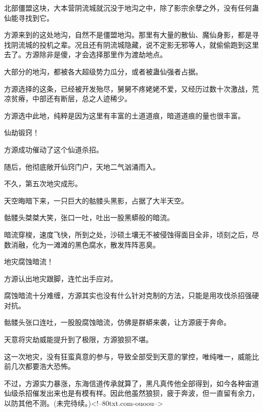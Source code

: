 \begin{this_body}
北部僵盟这块，大本营阴流城就沉没于地沟之中，除了影宗余孽之外，没有任何蛊仙能寻找到它。

方源来到的这处地沟，自然不是僵盟地沟。那里有大量的散仙、魔仙身影，都是寻找阴流城的投机之辈。况且还有阴流城隐藏，说不定影无邪等人，就偷偷跑到这里去了。方源除非是傻，才会选择那里作为渡劫地点。

大部分的地沟，都被各大超级势力瓜分，或者被蛊仙强者占据。

方源选择的这条，已经被开发殆尽，舅舅不疼姥姥不爱，又经历过数十次激战，荒凉贫瘠，中部还有断层，总之人迹稀少。

方源选中此地，纯粹是因为这里有丰富的土道道痕，暗道道痕的量也很丰富。

仙劫锻窍！

方源成功催动了这个仙道杀招。

随后，他彻底敞开仙窍门户，天地二气汹涌而入。

不久，第五次地灾成形。

天空晦暗下来，一只巨大的骷髅头黑影，占据了大半天空。

骷髅头桀桀大笑，张口一吐，吐出一股黑蟒般的暗流。

暗流穿梭，速度飞快，所到之处，沙硕土壤无不被侵蚀得面目全非，顷刻之后，尽数消融，化为一滩滩的黑色腐水，散发阵阵恶臭。

地灾腐蚀暗流！

方源认出地灾跟脚，连忙出手应对。

腐蚀暗流十分难缠，方源其实也没有什么针对克制的方法，只能是用攻伐杀招强硬对抗。

骷髅头张口连吐，一股股腐蚀暗流，仿佛是群蟒来袭，让方源疲于奔命。

天意将灾劫威能提升到了极限，方源狼狈不堪。

这一次地灾，没有狂蛮真意的参与，导致全部受到天意的掌控，唯纯唯一，威能比前几次都要浩大恐怖。

不过，方源实力暴涨，东海信道传承就算了，黑凡真传他全部得到，如今各种宙道仙级杀招催发出来也是有模有样。因此他虽然狼狈，疲于奔波，但一直留有余力，以防其他不测。(未完待续。)<!--80txt.com-ouoou-->

\end{this_body}

